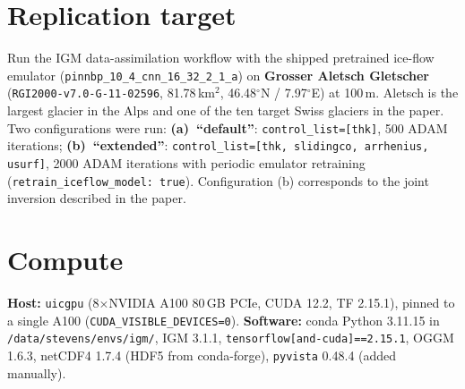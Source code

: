 \documentclass[11pt]{article}
\begin{document}
\section{Replication target}
Run the IGM data-assimilation workflow with the shipped pretrained ice-flow emulator
(\texttt{pinnbp\_10\_4\_cnn\_16\_32\_2\_1\_a}) on
\textbf{Grosser Aletsch Gletscher} (\texttt{RGI2000-v7.0-G-11-02596}, 81.78\,km$^2$,
46.48$^\circ$N / 7.97$^\circ$E) at 100\,m. Aletsch is the largest glacier in the Alps and
one of the ten target Swiss glaciers in the paper. Two configurations were run:
\textbf{(a)~``default''}: \texttt{control\_list=[thk]}, 500 ADAM iterations;
\textbf{(b)~``extended''}: \texttt{control\_list=[thk, slidingco, arrhenius, usurf]},
2000 ADAM iterations with periodic emulator retraining
(\texttt{retrain\_iceflow\_model: true}). Configuration (b) corresponds to the joint
inversion described in the paper.

\section{Compute}
\textbf{Host:} \texttt{uicgpu} (8$\times$NVIDIA A100 80\,GB PCIe, CUDA 12.2, TF 2.15.1),
pinned to a single A100 (\texttt{CUDA\_VISIBLE\_DEVICES=0}).
\textbf{Software:} conda Python 3.11.15 in \texttt{/data/stevens/envs/igm/}, IGM 3.1.1,
\texttt{tensorflow[and-cuda]==2.15.1}, OGGM 1.6.3, netCDF4 1.7.4 (HDF5 from conda-forge),
\texttt{pyvista} 0.48.4 (added manually).
\end{document}

